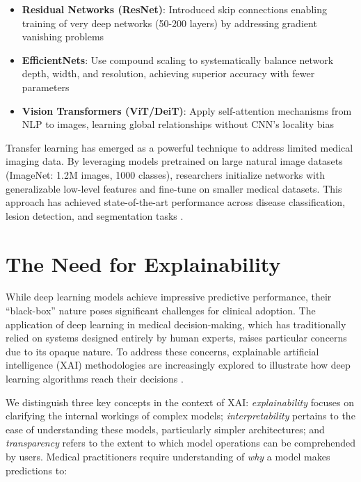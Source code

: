 \begin{itemize}
    \item \textbf{Residual Networks (ResNet)}: Introduced skip connections enabling training of very deep networks (50-200 layers) by addressing gradient vanishing problems \cite{he2016deep}
    \item \textbf{EfficientNets}: Use compound scaling to systematically balance network depth, width, and resolution, achieving superior accuracy with fewer parameters \cite{tan2019efficientnet}
    \item \textbf{Vision Transformers (ViT/DeiT)}: Apply self-attention mechanisms from NLP to images, learning global relationships without CNN's locality bias \cite{dosovitskiy2021image}
\end{itemize}

Transfer learning has emerged as a powerful technique to address limited medical imaging data. By leveraging models pretrained on large natural image datasets (ImageNet: 1.2M images, 1000 classes), researchers initialize networks with generalizable low-level features and fine-tune on smaller medical datasets. This approach has achieved state-of-the-art performance across disease classification, lesion detection, and segmentation tasks \cite{tajbakhsh2016convolutional}.

\section{The Need for Explainability}

While deep learning models achieve impressive predictive performance, their ``black-box'' nature poses significant challenges for clinical adoption. The application of deep learning in medical decision-making, which has traditionally relied on systems designed entirely by human experts, raises particular concerns due to its opaque nature. To address these concerns, explainable artificial intelligence (XAI) methodologies are increasingly explored to illustrate how deep learning algorithms reach their decisions \cite{selvaraju2017grad}.

We distinguish three key concepts in the context of XAI: \textit{explainability} focuses on clarifying the internal workings of complex models; \textit{interpretability} pertains to the ease of understanding these models, particularly simpler architectures; and \textit{transparency} refers to the extent to which model operations can be comprehended by users. Medical practitioners require understanding of \textit{why} a model makes predictions to:

